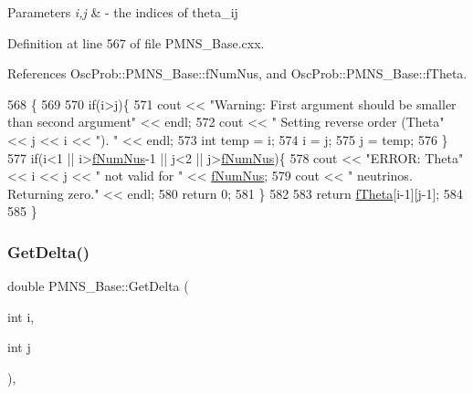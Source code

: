 \begin{DoxyParams}{Parameters}
{\em i,j} & -\/ the indices of theta\+\_\+ij \\
\hline
\end{DoxyParams}


Definition at line 567 of file P\+M\+N\+S\+\_\+\+Base.\+cxx.



References Osc\+Prob\+::\+P\+M\+N\+S\+\_\+\+Base\+::f\+Num\+Nus, and Osc\+Prob\+::\+P\+M\+N\+S\+\_\+\+Base\+::f\+Theta.


\begin{DoxyCode}
568 \{
569 
570   \textcolor{keywordflow}{if}(i>j)\{
571     cout << \textcolor{stringliteral}{"Warning: First argument should be smaller than second argument"} << endl;
572     cout << \textcolor{stringliteral}{"         Setting reverse order (Theta"} << j << i << \textcolor{stringliteral}{"). "} << endl;
573     \textcolor{keywordtype}{int} temp = i;
574     i = j;
575     j = temp;
576   \}
577   \textcolor{keywordflow}{if}(i<1 || i>\hyperlink{classOscProb_1_1PMNS__Base_a24bb74bed63569dfe88b18fa6a08060e}{fNumNus}-1 || j<2 || j>\hyperlink{classOscProb_1_1PMNS__Base_a24bb74bed63569dfe88b18fa6a08060e}{fNumNus})\{
578     cout << \textcolor{stringliteral}{"ERROR: Theta"} << i << j << \textcolor{stringliteral}{" not valid for "} << \hyperlink{classOscProb_1_1PMNS__Base_a24bb74bed63569dfe88b18fa6a08060e}{fNumNus};
579     cout << \textcolor{stringliteral}{" neutrinos. Returning zero."} << endl;
580     \textcolor{keywordflow}{return} 0;
581   \}
582 
583   \textcolor{keywordflow}{return} \hyperlink{classOscProb_1_1PMNS__Base_a1976887cd658dd86b2336c181f1470b4}{fTheta}[i-1][j-1];
584 
585 \}
\end{DoxyCode}
\mbox{\label{classOscProb_1_1PMNS__Base_adb8dbc91d4286d2e7c8f768c59476241}} 
\subsubsection{\texorpdfstring{Get\+Delta()}{GetDelta()}}
{\footnotesize\ttfamily double P\+M\+N\+S\+\_\+\+Base\+::\+Get\+Delta (\begin{DoxyParamCaption}\item[{int}]{i,  }\item[{int}]{j }\end{DoxyParamCaption})\hspace{0.3cm}{\ttfamily [virtual]}, {\ttfamily [inherited]}}

